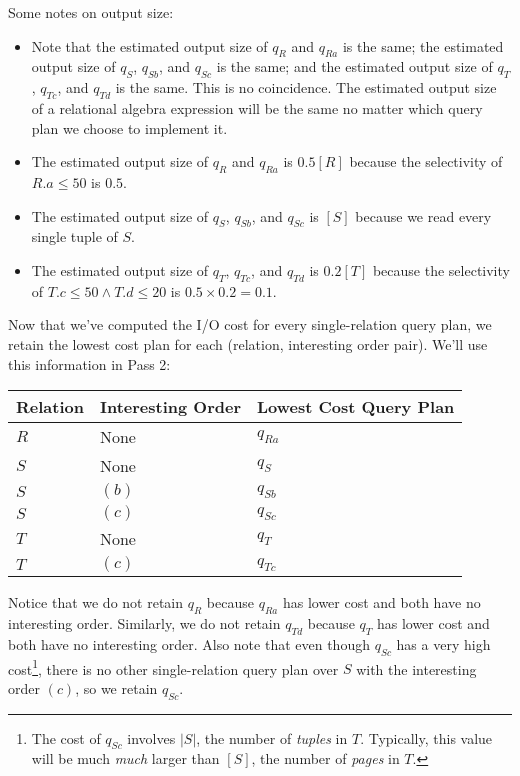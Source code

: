\documentclass{article}
\begin{document}
Some notes on output size:
\begin{itemize}
  \item
    Note that the estimated output size of $q_R$ and $q_{Ra}$ is the same; the
    estimated output size of $q_S$, $q_{Sb}$, and $q_{Sc}$ is the same; and the
    estimated output size of $q_T$, $q_{Tc}$, and $q_{Td}$ is the same. This is
    no coincidence. The estimated output size of a relational algebra
    expression will be the same no matter which query plan we choose to
    implement it.

  \item
    The estimated output size of $q_R$ and $q_{Ra}$ is $0.5[R]$ because the
    selectivity of $R.a \leq 50$ is $0.5$.

  \item
    The estimated output size of $q_S$, $q_{Sb}$, and $q_{Sc}$ is $[S]$ because
    we read every single tuple of $S$.

  \item
    The estimated output size of $q_T$, $q_{Tc}$, and $q_{Td}$ is $0.2[T]$
    because the selectivity of $T.c \leq 50 \land T.d \leq 20$ is $0.5 \times
    0.2 = 0.1$.
\end{itemize}

Now that we've computed the I/O cost for every single-relation query plan, we
retain the lowest cost plan for each (relation, interesting order pair).  We'll
use this information in Pass 2:

\begin{center}
  \begin{tabular}{|l|l|l|}
    \hline
    Relation & Interesting Order & Lowest Cost Query Plan \\\hline\hline
    $R$      & None              & $q_{Ra}$ \\\hline
    $S$      & None              & $q_{S}$ \\\hline
    $S$      & $(b)$             & $q_{Sb}$ \\\hline
    $S$      & $(c)$             & $q_{Sc}$ \\\hline
    $T$      & None              & $q_{T}$ \\\hline
    $T$      & $(c)$             & $q_{Tc}$ \\\hline
  \end{tabular}
\end{center}

Notice that we do not retain $q_{R}$ because $q_{Ra}$ has lower cost and both
have no interesting order.  Similarly, we do not retain $q_{Td}$ because
$q_{T}$ has lower cost and both have no interesting order. Also note that even
though $q_{Sc}$ has a very high cost\footnote{The cost of $q_{Sc}$ involves
$|S|$, the number of \emph{tuples} in $T$. Typically, this value will be much
\emph{much} larger than $[S]$, the number of \emph{pages} in $T$.}, there is no
other single-relation query plan over $S$ with the interesting order $(c)$, so
we retain $q_{Sc}$.
\end{document}
